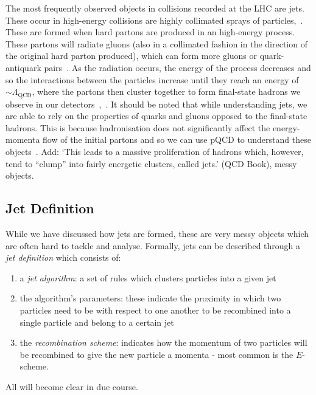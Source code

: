 {\color{RoyalBlue}The most frequently observed objects in collisions recorded at the LHC are jets. These occur in high-energy collisions are highly collimated sprays of particles,~\cite{Banfi:2016yyq}. These are formed when hard partons are produced in an high-energy process. These partons will radiate gluons (also in a collimated fashion in the direction of the original hard parton produced), which can form more gluons or quark-antiquark pairs~\cite{Schwartz:2014sze}. As the radiation occurs, the energy of the process decreases and so the interactions between the particles increase until they reach an energy of $\sim \Lambda_{\mathrm{QCD}}$, where the partons then cluster together to form final-state hadrons we observe in our detectors~\cite{Schwartz:2014sze},~\cite{Banfi:2016yyq}.} {\color{red} It should be noted that while understanding jets, we are able to rely on the properties of quarks and gluons opposed to the final-state hadrons. This is because hadronisation does not significantly affect the energy-momenta flow of the initial partons and so we can use pQCD to understand these objects~\cite{Banfi:2016yyq}.} {\color{blue} Add: `This leads to a massive proliferation of hadrons which, however, tend to “clump” into fairly energetic clusters, called jets.'  (QCD Book), messy objects.}






\subsection{Jet Definition}

While we have discussed how jets are formed, these are very messy objects which are often hard to tackle and analyse. Formally, jets can be described through a \emph{jet definition} which consists of: 
\begin{enumerate}
\item a \emph{jet algorithm}:  a set of rules which clusters particles into a given jet
\item the algorithm's parameters: these indicate the proximity in which two particles need to be with respect to one another to be recombined into a single particle and belong to a certain jet
\item  the \emph{recombination scheme}: indicates how the momentum of two particles will be recombined to give the new particle a momenta - most common is the $E$-scheme.
\end{enumerate} 
All will become clear in due course. 

